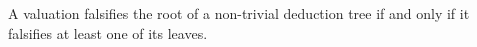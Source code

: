 

\setcounter{section}{2}
\setcounter{subsection}{6}
\setcounter{dfn}{16}

\begin{lem}
\label{lem:FalsifyRoot}
A valuation falsifies the root of a non-trivial deduction tree if and only if it falsifies at least one of its leaves.
\end{lem}

